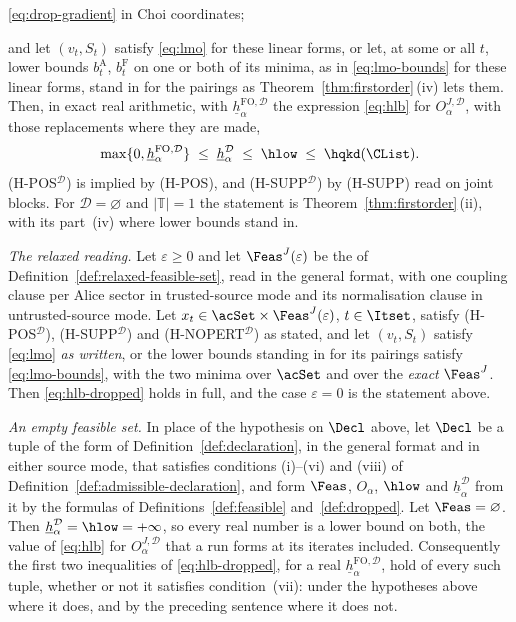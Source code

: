 \begin{corollary}
\begin{itemize}[leftmargin=3.4em]
  \eqref{eq:drop-gradient} in Choi coordinates;
\end{itemize}
and let $(v_t,S_t)$ satisfy \eqref{eq:lmo} for these linear forms, or let,
at some or all $t$, lower bounds $b^{\mathrm A}_t$, $b^{\mathrm F}_t$ on
one or both of its minima, as in \eqref{eq:lmo-bounds} for these linear
forms, stand in for the pairings as Theorem~\ref{thm:firstorder}\,(iv)
lets them. Then, in
exact real arithmetic, with $\underline{h}^{\mathrm{FO},\mathcal{D}}_{\alpha}$
the expression \eqref{eq:hlb} for $O^{J,\mathcal{D}}_{\alpha}$, with those
replacements where they are made,
\begin{equation}\label{eq:hlb-dropped}
  \max\{0,\underline{h}^{\mathrm{FO},\mathcal{D}}_{\alpha}\}\;\le\;\underline{h}^{\mathcal{D}}_{\alpha}
  \;\le\;\hlow\;\le\;\hqkd(\CList).
\end{equation}
(H-POS$^{\mathcal{D}}$) is implied by (H-POS), and
(H-SUPP$^{\mathcal{D}}$) by (H-SUPP) read on joint blocks. For
$\mathcal{D}=\varnothing$ and $|\mathbb{T}|=1$ the statement is
Theorem~\ref{thm:firstorder}\,(ii), with its part~(iv) where lower bounds
stand in.

\emph{The relaxed reading.} Let $\varepsilon\ge0$ and let
$\Feas^{J}(\varepsilon)$ be the  of
Definition~\ref{def:relaxed-feasible-set}, read in the general format, with
one coupling clause per Alice sector in trusted-source mode and its
normalisation clause in untrusted-source mode. Let
$x_t\in\acSet\times\Feas^{J}(\varepsilon)$, $t\in\Itset$, satisfy
(H-POS$^{\mathcal{D}}$), (H-SUPP$^{\mathcal{D}}$) and
(H-NOPERT$^{\mathcal{D}}$) as stated, and let $(v_t,S_t)$ satisfy
\eqref{eq:lmo} \emph{as written}, or the lower bounds standing in for its
pairings satisfy \eqref{eq:lmo-bounds}, with the two minima over $\acSet$
and over the \emph{exact} $\Feas^{J}$. Then \eqref{eq:hlb-dropped} holds in
full, and the case $\varepsilon=0$ is the statement above.

\emph{An empty feasible set.} In place of the hypothesis on $\Decl$ above,
let $\Decl$ be a tuple of the form of Definition~\ref{def:declaration}, in
the general format and in either source mode, that satisfies conditions
(i)--(vi) and (viii) of Definition~\ref{def:admissible-declaration}, and form
$\Feas$, $O_{\alpha}$, $\hlow$ and $\underline{h}^{\mathcal{D}}_{\alpha}$ from
it by the formulas of Definitions~\ref{def:feasible} and~\ref{def:dropped}.
Let $\Feas=\varnothing$. Then
$\underline{h}^{\mathcal{D}}_{\alpha}=\hlow=+\infty$, so every real number is
a lower bound on both, the value of \eqref{eq:hlb} for
$O^{J,\mathcal{D}}_{\alpha}$ that a run forms at its iterates included.
Consequently the first two inequalities of \eqref{eq:hlb-dropped}, for a real
$\underline{h}^{\mathrm{FO},\mathcal{D}}_{\alpha}$, hold of every such
tuple, whether or not it satisfies condition~(vii): under the hypotheses above where it does,
and by the preceding sentence where it does not.
\end{corollary}

